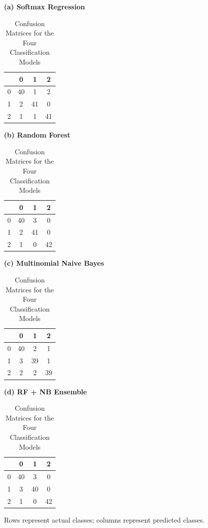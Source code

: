 \documentclass[12pt]{article}
\begin{document}
\begin{table}[H]
    \centering
    \caption{Confusion Matrices for the Four Classification Models}
    \label{tab:confusion_matrices}
    \small

    \begin{minipage}{0.48\textwidth}
        \centering
        \textbf{(a) Softmax Regression}\\[4pt]
        \begin{tabular}{c|ccc}
            & 0 & 1 & 2 \\
            \hline
            0 & 40 & 1 & 2 \\
            1 & 2 & 41 & 0 \\
            2 & 1 & 1 & 41 \\
        \end{tabular}
    \end{minipage}
    \hfill
    \begin{minipage}{0.48\textwidth}
        \centering
        \textbf{(b) Random Forest}\\[4pt]
        \begin{tabular}{c|ccc}
            & 0 & 1 & 2 \\
            \hline
            0 & 40 & 3 & 0 \\
            1 & 2 & 41 & 0 \\
            2 & 1 & 0 & 42 \\
        \end{tabular}
    \end{minipage}

    \vspace{0.6cm}

    \begin{minipage}{0.48\textwidth}
        \centering
        \textbf{(c) Multinomial Naive Bayes}\\[4pt]
        \begin{tabular}{c|ccc}
            & 0 & 1 & 2 \\
            \hline
            0 & 40 & 2 & 1 \\
            1 & 3 & 39 & 1 \\
            2 & 2 & 2 & 39 \\
        \end{tabular}
    \end{minipage}
    \hfill
    \begin{minipage}{0.48\textwidth}
        \centering
        \textbf{(d) RF + NB Ensemble}\\[4pt]
        \begin{tabular}{c|ccc}
            & 0 & 1 & 2 \\
            \hline
            0 & 40 & 3 & 0 \\
            1 & 3 & 40 & 0 \\
            2 & 1 & 0 & 42 \\
        \end{tabular}
    \end{minipage}

    \vspace{0.2cm}
    \footnotesize
    Rows represent actual classes; columns represent predicted classes.
\end{table}
\end{document}
